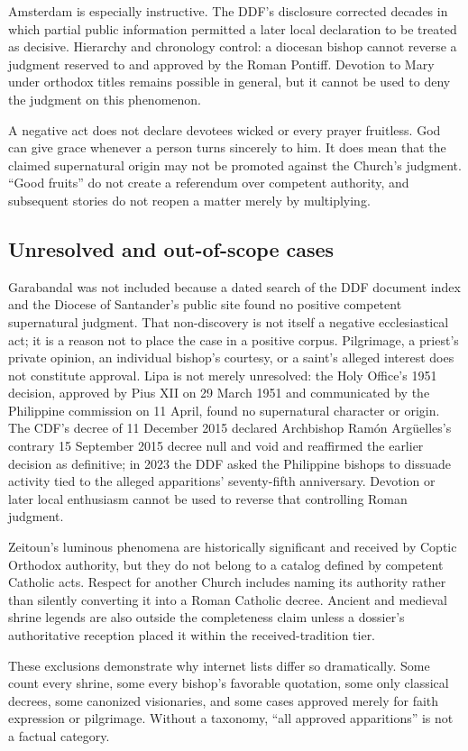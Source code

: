 {Amsterdam is especially instructive. The DDF's disclosure corrected decades in which partial public information permitted a later local declaration to be treated as decisive. Hierarchy and chronology control: a diocesan bishop cannot reverse a judgment reserved to and approved by the Roman Pontiff. Devotion to Mary under orthodox titles remains possible in general, but it cannot be used to deny the judgment on this phenomenon.

A negative act does not declare devotees wicked or every prayer fruitless. God can give grace whenever a person turns sincerely to him. It does mean that the claimed supernatural origin may not be promoted against the Church's judgment. ``Good fruits'' do not create a referendum over competent authority, and subsequent stories do not reopen a matter merely by multiplying.

\subsection{Unresolved and out-of-scope cases}

Garabandal was not included because a dated search of the DDF document index and the Diocese of Santander's public site found no positive competent supernatural judgment. That non-discovery is not itself a negative ecclesiastical act; it is a reason not to place the case in a positive corpus. Pilgrimage, a priest's private opinion, an individual bishop's courtesy, or a saint's alleged interest does not constitute approval. Lipa is not merely unresolved: the Holy Office's 1951 decision, approved by Pius XII on 29 March 1951 and communicated by the Philippine commission on 11 April, found no supernatural character or origin. The CDF's decree of 11 December 2015 declared Archbishop Ramón Argüelles's contrary 15 September 2015 decree null and void and reaffirmed the earlier decision as definitive; in 2023 the DDF asked the Philippine bishops to dissuade activity tied to the alleged apparitions' seventy-fifth anniversary. Devotion or later local enthusiasm cannot be used to reverse that controlling Roman judgment.

Zeitoun's luminous phenomena are historically significant and received by Coptic Orthodox authority, but they do not belong to a catalog defined by competent Catholic acts. Respect for another Church includes naming its authority rather than silently converting it into a Roman Catholic decree. Ancient and medieval shrine legends are also outside the completeness claim unless a dossier's authoritative reception placed it within the received-tradition tier.

These exclusions demonstrate why internet lists differ so dramatically. Some count every shrine, some every bishop's favorable quotation, some only classical  decrees, some canonized visionaries, and some cases approved merely for faith expression or pilgrimage. Without a taxonomy, ``all approved apparitions'' is not a factual category.
}

